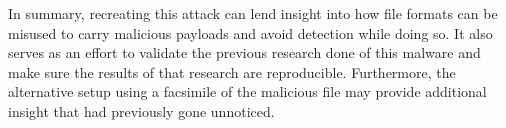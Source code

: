 In summary, recreating this attack can lend insight into how file formats can be misused to carry malicious payloads and
avoid detection while doing so. It also serves as an effort to validate the previous research done of this malware and
make sure the results of that research are reproducible. Furthermore, the alternative setup using a facsimile of the
malicious file may provide additional insight that had previously gone unnoticed.

\clearpage

